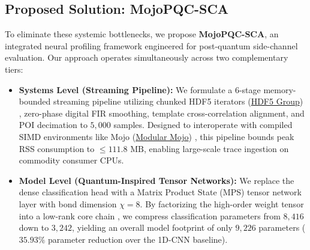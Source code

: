 \documentclass[letterpaper]{article}
\begin{document}
\subsection{Proposed Solution: MojoPQC-SCA}
To eliminate these systemic bottlenecks, we propose \textbf{MojoPQC-SCA}, an integrated neural profiling framework engineered for post-quantum side-channel evaluation. Our approach operates simultaneously across two complementary tiers:
\begin{itemize}
    \item \textbf{Systems Level (Streaming Pipeline):} We formulate a 6-stage memory-bounded streaming pipeline utilizing chunked HDF5 iterators (\href{https://www.hdfgroup.org/HDF5/}{HDF5 Group}) \cite{hdfgroup2020hdf5}, zero-phase digital FIR smoothing, template cross-correlation alignment, and POI decimation to $5,000$ samples. Designed to interoperate with compiled SIMD environments like Mojo (\href{https://www.modular.com/mojo}{Modular Mojo}) \cite{lattner2023mojo}, this pipeline bounds peak RSS consumption to $\le 111.8\text{ MB}$, enabling large-scale trace ingestion on commodity consumer CPUs.
    \item \textbf{Model Level (Quantum-Inspired Tensor Networks):} We replace the dense classification head with a Matrix Product State (MPS) tensor network layer with bond dimension $\chi = 8$. By factorizing the high-order weight tensor into a low-rank core chain \cite{novikov2015tensorizing,stoudenmire2016supervised,cichocki2016tensor,glass2020quantum,oseledets2011tensor,huggins2019towards}, we compress classification parameters from $8,416$ down to $3,242$, yielding an overall model footprint of only $9,226$ parameters ($35.93\%$ parameter reduction over the 1D-CNN baseline).
\end{itemize}
\end{document}
